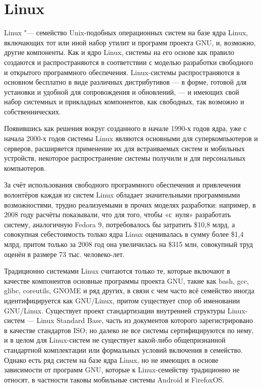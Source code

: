 \renewcommand \contentsname {\centerline{\bfseries\large{\MakeUppercase{содержание}}}}
\setcounter{page}{2}
{
\normalsize\selectfont
\tableofcontents
\newpage
}
\part*{Linux}
\par Linux  "--- семейство Unix-подобных операционных систем на базе ядра Linux, включающих тот или иной набор утилит и программ проекта GNU, и, возможно, другие компоненты. Как и ядро Linux, системы на его основе как правило создаются и распространяются в соответствии с моделью разработки свободного и открытого программного обеспечения. Linux-системы распространяются в основном бесплатно в виде различных дистрибутивов — в форме, готовой для установки и удобной для сопровождения и обновлений, — и имеющих свой набор системных и прикладных компонентов, как свободных, так возможно и собственнических.

Появившись как решения вокруг созданного в начале 1990-х годов ядра, уже с начала 2000-х годов системы Linux являются основными для суперкомпьютеров и серверов, расширяется применение их для встраиваемых систем и мобильных устройств, некоторое распространение системы получили и для персональных компьютеров.

За счёт использования свободного программного обеспечения и привлечения волонтёров каждая из систем Linux обладает значительными программными возможностями, трудно реализуемыми в прочих моделях разработки: например, в 2008 году расчёты показывали, что для того, чтобы «с~нуля» разработать систему, аналогичную Fedora 9, потребовалось бы затратить \$10,8 млрд, а совокупная себестоимость только ядра Linux оценивалась в сумму более \$1,4 млрд, притом только за 2008 год она увеличилась на \$315 млн, совокупный труд оценён в размере 73 тыс. человеко-лет.

Традиционно системами Linux считаются только те, которые включают в качестве компонентов основные программы проекта GNU, такие как bash, gcc, glibc, coreutils, GNOME и ряд других, в связи с чем часто всё семейство иногда идентифицируется как GNU/Linux, притом существует спор об именовании GNU/Linux. Существует проект стандартизации внутренней структуры Linux-систем — Linux Standard Base, часть из документов которого зарегистрировано в качестве стандартов ISO; но далеко не все системы сертифицируются по нему, и в целом для Linux-систем не существует какой-либо общепризнанной стандартной комплектации или формальных условий включения в семейство. Однако есть ряд систем на базе ядра Linux, но не имеющих в основе зависимости от программ GNU, которые к Linux-семейству традиционно не относят, в частности таковы мобильные системы Android и FirefoxOS.


